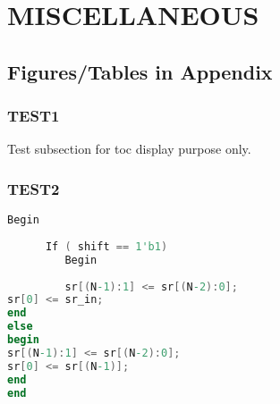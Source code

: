 \chapter{MISCELLANEOUS \label{cha:appendix}}

\section{Figures/Tables in Appendix}








\subsection{TEST1}
Test subsection for toc display purpose only.




\subsection{TEST2}
\begin{lstlisting}[language={Verilog},tabsize=12,]
  Begin
     
      If ( shift == 1'b1)
         Begin
         
         sr[(N-1):1] <= sr[(N-2):0];
sr[0] <= sr_in;
end
else
begin
sr[(N-1):1] <= sr[(N-2):0];
sr[0] <= sr[(N-1)];
end
end
\end{lstlisting}


